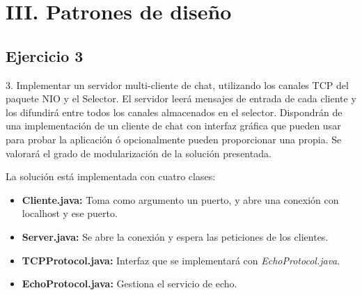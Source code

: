 \documentclass{article}
\begin{document}
\section{III. Patrones de diseño}

\subsection{Ejercicio 3}

3. Implementar un servidor multi-cliente de chat, utilizando los canales TCP del paquete NIO
y el Selector. El servidor leerá mensajes de entrada de cada cliente y los difundirá entre todos los canales almacenados en el selector. Dispondrán de una implementación de un cliente de chat con interfaz gráfica que pueden usar para probar la aplicación ó opcionalmente pueden
proporcionar una propia. Se valorará el grado de modularización de la solución presentada.

La solución está implementada con cuatro clases:

\begin{itemize}
\item \textbf{Cliente.java:} Toma como argumento un puerto, y abre una conexión con localhost y ese puerto.
\item \textbf{Server.java:} Se abre la conexión y espera las peticiones de los clientes.
\item \textbf{TCPProtocol.java:} Interfaz que se implementará con \textit{EchoProtocol.java}.
\item \textbf{EchoProtocol.java:} Gestiona el servicio de echo.
\end{itemize}
\end{document}
